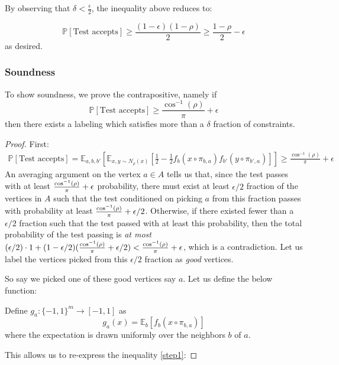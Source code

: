 By observing that $\delta < \frac{\epsilon}{2}$, the inequality above reduces to:

\begin{equation}
  \mathbb{P}[\text{Test accepts}] \geq \frac{(1-\epsilon)(1 - \rho)}{2} \geq \frac{1 - \rho}{2} - \epsilon
\end{equation}
as desired.

\subsubsection{Soundness}
To show soundness, we prove the contrapositive, namely if
$$ \mathbb{P}[\text{Test accepts}] \geq \frac{\cos^{-1}(\rho)}{\pi} + \epsilon $$
then there exists a labeling which satisfies more than a $\delta$ fraction of constraints.
%
\begin{proof}
First:
\begin{align} \label{step1}
  \mathbb{P}[\text{Test accepts}] = \mathbb{E}_{a,b,b'}\left[
  \mathbb{E}_{x,y\sim N_{\rho}(x)}\left[
  \frac{1}{2} - \frac{1}{2}f_b(x \circ \pi_{b,a})f_{b'}(y \circ \pi_{b',a})\right]\right] \geq \frac{\cos^{-1}(\rho)}{\pi} + \epsilon
\end{align}
An averaging argument on the vertex $a \in A$ tells us that, since the test passes with at least $\frac{\cos^{-1}(\rho)}{\pi} + \epsilon$ probability, there must exist at least $\epsilon/2$ fraction of the vertices in $A$ such that the test conditioned on picking $a$ from this fraction passes with probability at least $\frac{\cos^{-1}(\rho)}{\pi} + \epsilon/2$. Otherwise, if there existed fewer than a $\epsilon/2$ fraction such that the test passed with at least this probability, then the total probability of the test passing is \emph{at most} $(\epsilon/2)\cdot 1 + (1 - \epsilon/2)(\frac{\cos^{-1}(\rho)}{\pi} + \epsilon/2) < \frac{\cos^{-1}(\rho)}{\pi} + \epsilon$, which is a contradiction. Let us label the vertices picked from this $\epsilon/2$ fraction as \emph{good} vertices. \newline

So say we picked one of these good vertices say $a$. Let us define the below function:

\begin{definition}
  Define $g_a: \{-1,1\}^m \rightarrow [-1,1]$ as
  \begin{equation}
    g_a(x) = \mathbb{E}_{b}\left[f_b(x \circ \pi_{b,a}) \right]
  \end{equation}
  where the expectation is drawn uniformly over the neighbors $b$ of $a$.
\end{definition}
%
This allows us to re-express the inequality \ref{step1}:


\end{proof}
